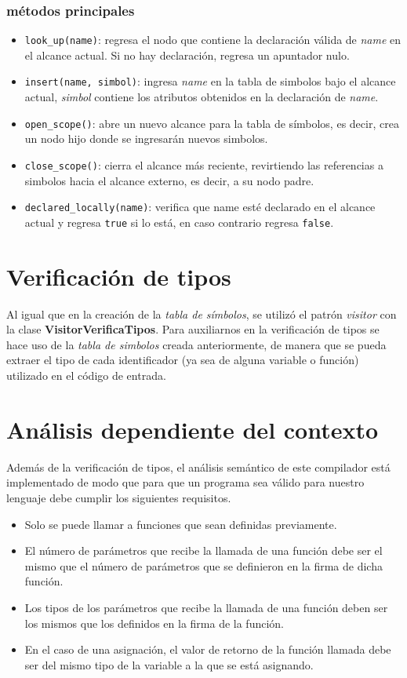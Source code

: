 \documentclass[12pt]{article}
\begin{document}
\subsubsection{métodos principales}
\begin{itemize}
\item \texttt{look\_up(name)}: regresa el nodo que contiene la declaración válida de \emph{name} en el alcance actual. Si no hay declaración, regresa un apuntador nulo.
\item \texttt{insert(name, simbol)}: ingresa \emph{name} en la tabla de simbolos bajo el alcance actual, \emph{simbol} contiene los atributos obtenidos en la declaración de \emph{name}.
\item \texttt{open\_scope()}: abre un nuevo alcance para la tabla de símbolos, es decir, crea un nodo hijo donde se ingresarán nuevos simbolos.
\item \texttt{close\_scope()}: cierra el alcance más reciente, revirtiendo las referencias a simbolos hacia el alcance externo, es decir, a su nodo padre.
\item \texttt{declared\_locally(name)}: verifica que name esté declarado en el alcance actual y regresa \texttt{true} si lo está, en caso contrario regresa \texttt{false}.
\end{itemize}
\section{Verificación de tipos}
Al igual que en la creación de la \textit{tabla de símbolos}, se utilizó el patrón \textit{visitor} con la clase \textbf{VisitorVerificaTipos}. Para auxiliarnos en la verificación de tipos se hace uso de la \textit{tabla de simbolos} creada anteriormente, de manera que se pueda extraer el tipo de cada identificador (ya sea de alguna variable o función) utilizado en el código de entrada.

\section{Análisis dependiente del contexto}
Además de la verificación de tipos, el análisis semántico de este compilador está implementado de modo que para que un programa sea válido para nuestro lenguaje debe cumplir los siguientes requisitos.
\begin{itemize}
\item Solo se puede llamar a funciones que sean definidas previamente.
\item El número de parámetros que recibe la llamada de una función debe ser el mismo que el número de parámetros que se definieron en la firma de dicha función.
\item Los tipos de los parámetros que recibe la llamada de una función deben ser los mismos que los definidos en la firma de la función.
\item En el caso de una asignación, el valor de retorno de la función llamada debe ser del mismo tipo de la variable a la que se está asignando. 
\end{itemize}
\end{document}
